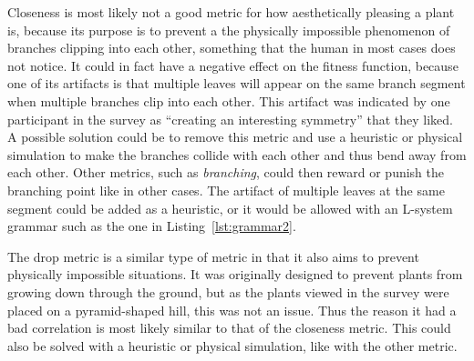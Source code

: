 Closeness is most likely not a good metric for how aesthetically pleasing a plant is, because its purpose is to prevent a the physically impossible phenomenon of branches clipping into each other, something that the human in most cases does not notice.
It could in fact have a negative effect on the fitness function, because one of its artifacts is that multiple leaves will appear on the same branch segment when multiple branches clip into each other.
This artifact was indicated by one participant in the survey as ``creating an interesting symmetry'' that they liked.
A possible solution could be to remove this metric and use a heuristic or physical simulation to make the branches collide with each other and thus bend away from each other.
Other metrics, such as \textit{branching}, could then reward or punish the branching point like in other cases.
The artifact of multiple leaves at the same segment could be added as a heuristic, or it would be allowed with an L-system grammar such as the one in Listing~\ref{lst:grammar2}.

The drop metric is a similar type of metric in that it also aims to prevent physically impossible situations.
It was originally designed to prevent plants from growing down through the ground, but as the plants viewed in the survey were placed on a pyramid-shaped hill, this was not an issue.
Thus the reason it had a bad correlation is most likely similar to that of the closeness metric.
This could also be solved with a heuristic or physical simulation, like with the other metric.

